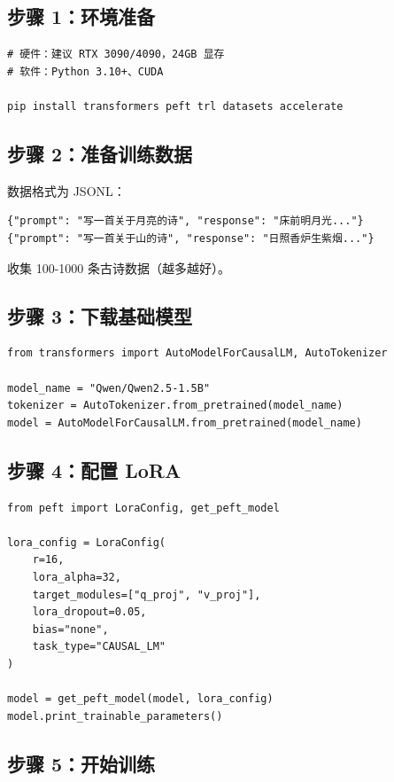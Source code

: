 \documentclass[12pt,UTF8]{ctexbook}
\begin{document}
\subsection{步骤 1：环境准备}

\begin{verbatim}
# 硬件：建议 RTX 3090/4090，24GB 显存
# 软件：Python 3.10+、CUDA

pip install transformers peft trl datasets accelerate
\end{verbatim}

\subsection{步骤 2：准备训练数据}

数据格式为 JSONL：

\begin{verbatim}
{"prompt": "写一首关于月亮的诗", "response": "床前明月光..."}
{"prompt": "写一首关于山的诗", "response": "日照香炉生紫烟..."}
\end{verbatim}

收集 100-1000 条古诗数据（越多越好）。

\subsection{步骤 3：下载基础模型}

\begin{verbatim}
from transformers import AutoModelForCausalLM, AutoTokenizer

model_name = "Qwen/Qwen2.5-1.5B"
tokenizer = AutoTokenizer.from_pretrained(model_name)
model = AutoModelForCausalLM.from_pretrained(model_name)
\end{verbatim}

\subsection{步骤 4：配置 LoRA}

\begin{verbatim}
from peft import LoraConfig, get_peft_model

lora_config = LoraConfig(
    r=16,
    lora_alpha=32,
    target_modules=["q_proj", "v_proj"],
    lora_dropout=0.05,
    bias="none",
    task_type="CAUSAL_LM"
)

model = get_peft_model(model, lora_config)
model.print_trainable_parameters()
\end{verbatim}

\subsection{步骤 5：开始训练}
\end{document}
